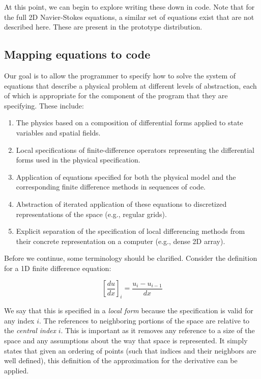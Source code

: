 At this point, we can begin to explore writing these down in code.  Note that
for the full 2D Navier-Stokes equations, a similar set of equations exist 
that are not described here.  These are present in the \FIDDLE prototype
distribution.

\subsection{Mapping equations to code}

Our goal is to allow the programmer to specify how to solve the system of equations
that describe a physical problem at different levels of abstraction, each of which
is appropriate for the component of the program that they are specifying.  These
include:

\begin{enumerate}
\item The physics based on a composition of differential forms applied to state variables and spatial fields.
\item Local specifications of finite-difference operators representing the differential forms used in the physical specification.
\item Application of equations specified for both the physical model and the corresponding finite difference methods in sequences of code.
\item Abstraction of iterated application of these equations to discretized representations of the space (e.g., regular grids).
\item Explicit separation of the specification of local differencing methods from their concrete representation on a computer (e.g., dense 2D array).
\end{enumerate}

Before we continue, some terminology should be clarified.  Consider the
definition for a 1D finite difference equation:

\begin{equation}
\left[\frac{du}{dx}\right]_i = \frac{u_i - u_{i-1}}{dx}
\end{equation}

We say that this is specified in a \emph{local form} because the specification is
valid for any index $i$.  The references to neighboring portions of the space are
relative to the \emph{central index} $i$.  This is important as it removes
any reference to a size of the space and any assumptions about the way that
space is represented.  It simply states that given an ordering of points (such that
indices and their neighbors are well defined), this definition of the approximation
for the derivative can be applied.

